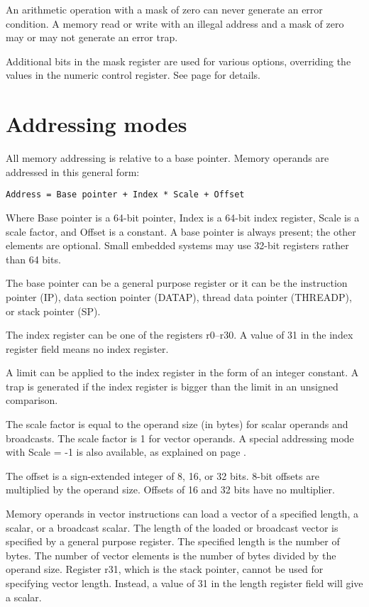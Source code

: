 \documentclass[forwardcom.tex]{subfiles}
\begin{document}
An arithmetic operation with a mask of zero can never generate an error condition. 
A memory read or write with an illegal address and a mask of zero may or may not generate an error trap.
\vv

Additional bits in the mask register are used for various options, overriding the values in the numeric control register. See page \pageref{table:maskBits} for details.

\section{Addressing modes}
All memory addressing is relative to a base pointer. Memory operands are addressed in this general form:

\begin{lstlisting}
Address = Base pointer + Index * Scale + Offset
\end{lstlisting}

Where Base pointer is a 64-bit pointer, Index is a 64-bit index register, Scale is a scale factor, and Offset is a constant. A base pointer is always present; the other elements are optional. Small embedded systems may use 32-bit registers rather than 64 bits.
\vv

The base pointer can be a general purpose register or it can be the 
instruction pointer (IP), data section pointer (DATAP), thread data pointer (THREADP), or stack pointer (SP).
\vv

The index register can be one of the registers r0--r30. A value of 31 in the index register field means no index register.
\vv

A limit can be applied to the index register in the form of an integer constant. A trap is generated if the index register is bigger than the limit in an unsigned comparison.
\vv

The scale factor is equal to the operand size (in bytes) for scalar operands and broadcasts. The scale factor is 1 for vector operands. A special addressing mode with 
Scale = -1 
is also available, as explained on page \pageref{vectorLoops}.
\vv

The offset is a sign-extended integer of 8, 16, or 32 bits. 8-bit offsets are multiplied by the operand size. Offsets of 16 and 32 bits have no multiplier.
\vv

Memory operands in vector instructions can load a vector of a specified length, a scalar, or a broadcast scalar. The length of the loaded or broadcast vector is specified by a general purpose register. The specified length is the number of bytes. The number of vector elements is the number of bytes divided by the operand size. Register r31, which is the stack pointer, cannot be used for specifying vector length. Instead, a value of 31 in the length register field will give a scalar.
\vv
\end{document}
